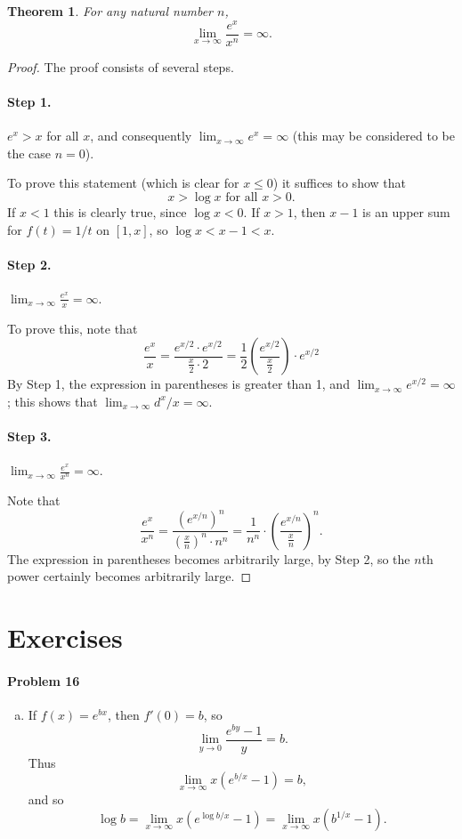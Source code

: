 \documentclass{article}
\newtheorem{theorem}{Theorem}
\begin{document}
\begin{theorem}
  For any natural number $n$, \[ \lim_{x \to \infty} \frac{e^x}{x^n} = \infty.
  \]
\end{theorem}
\begin{proof}
  The proof consists of several steps.

  \paragraph{Step 1.} $e^x > x$ for all $x$, and consequently
  $\lim_{x \to \infty} e^x = \infty$ (this may be considered to be the case $n
  = 0$).

  To prove this statement (which is clear for $x \leq 0$) it suffices to show
  that \[ x > \log x \text{ for all } x > 0. \] If $x < 1$ this is clearly
  true, since $\log x < 0$. If $x > 1$, then $x - 1$ is an upper sum for $f(t)
  = 1/t$ on $[1, x]$, so $\log x < x - 1 < x$.

  \paragraph{Step 2.} $\lim_{x \to \infty} \frac{e^x}{x} = \infty$.

  To prove this, note that \[
    \frac{e^x}{x}
    = \frac{e^{x/2} \cdot e^{x/2}}{\frac{x}{2} \cdot 2}
    = \frac{1}{2}\left(\frac{e^{x/2}}{\frac{x}{2}}\right) \cdot e^{x/2}
  \] By Step 1, the expression in parentheses is greater than 1, and
  $\lim_{x \to \infty} e^{x/2} = \infty$; this shows that $\lim_{x \to \infty}
  d^x/x = \infty$.

  \paragraph{Step 3.} $\lim_{x \to \infty} \frac{e^x}{x^n} = \infty$.

  Note that \[
    \frac{e^x}{x^n}
    = \frac{(e^{x/n})^n}{\left(\frac{x}{n}\right)^n \cdot n^n}
    = \frac{1}{n^n} \cdot \left(\frac{e^{x/n}}{\frac{x}{n}}\right)^n.
  \] The expression in parentheses becomes arbitrarily large, by Step 2, so the
  $n$th power certainly becomes arbitrarily large.
\end{proof}

\section*{Exercises}

\paragraph{Problem 16}
\begin{enumerate}[(e)]
  \item If $f(x) = e^{bx}$, then $f'(0) = b$, so \[
      \lim_{y \to 0} \frac{e^{by} - 1}{y} = b.
    \] Thus \[
      \lim_{x \to \infty} x(e^{b/x} - 1) = b,
    \] and so \[
      \log b = \lim_{x \to \infty} x(e^{\log b/x} - 1)
      = \lim_{x \to \infty} x(b^{1/x} - 1).
    \]
\end{enumerate}
\end{document}
